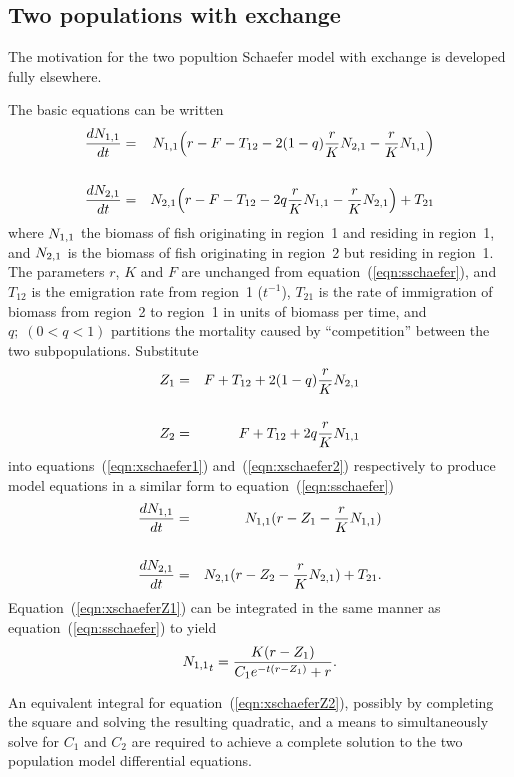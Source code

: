 \subsection{Two populations with exchange}
The motivation for the two popultion Schaefer model with exchange is
developed fully elsewhere. %

The basic equations can be written
\begin{eqnarray}
\label{eqn:xschaefer1}
\frac{d{N_{1,1}}}{dt}&=&{N_{1,1}}\Big(r-F-T_{12}-2(1-q)\frac{r}{K}{N_{2,1}}-\frac{r}{K}{N_{1,1}}\Big)\\
\nonumber\\
\label{eqn:xschaefer2}
\frac{d{N_{2,1}}}{dt}&=&{N_{2,1}}\Big(r-F-T_{12}-2q\frac{r}{K}{N_{1,1}}-\frac{r}{K}{N_{2,1}}\Big)+T_{21}
\end{eqnarray}
where ${N_{1,1}}$ the biomass of fish originating in region~1
and residing in region~1,
and ${N_{2,1}}$ is the biomass of fish originating in region~2
but residing in region~1.
The parameters $r$, $K$ and $F$ are unchanged from
equation~(\ref{eqn:sschaefer}), and
$T_{12}$ is the emigration rate from region~1 ($t^{-1}$), 
$T_{21}$ is the rate of immigration of biomass from region~2 to
region~1 in units of biomass per time,
and $q;\; (0 < q < 1)$ partitions the mortality caused by ``competition''
between the two subpopulations.
Substitute
\begin{eqnarray}
\label{eqn:Zdef}
Z_1&=&F+T_{12}+2(1-q)\frac{r}{K}{N_{2,1}}\\
\nonumber\\
Z_2&=&F+T_{12}+2q\frac{r}{K}{N_{1,1}}
\end{eqnarray}
into equations~(\ref{eqn:xschaefer1}) and~(\ref{eqn:xschaefer2})
respectively to produce model equations in a similar form to
equation~(\ref{eqn:sschaefer})
\begin{eqnarray}
\label{eqn:xschaeferZ1}
\frac{d{N_{1,1}}}{dt}&=&{N_{1,1}}(r-Z_1-\frac{r}{K}{N_{1,1}})\\
\nonumber\\
\label{eqn:xschaeferZ2}
\frac{d{N_{2,1}}}{dt}&=&{N_{2,1}}(r-Z_2-\frac{r}{K}{N_{2,1}})+T_{21}.
\end{eqnarray}
Equation~(\ref{eqn:xschaeferZ1}) can be integrated in the same manner as
equation~(\ref{eqn:sschaefer}) to yield
\begin{equation}
\label{eqn:N1tC}
{N_{1,1}}_t=\frac{K(r-Z_1)}{C_1e^{-t(r-Z_1)}+r}.
\end{equation}


An equivalent integral for
equation~(\ref{eqn:xschaeferZ2}), possibly by completing the square and
solving the resulting quadratic, and a means to simultaneously solve
for $C_1$ and $C_2$ are required to achieve a complete solution to
the two population model differential equations.

